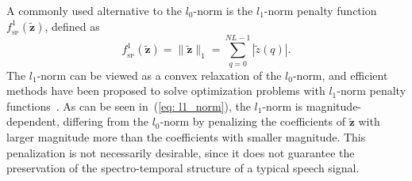 \documentclass[10pt]{IEEEtran}
\begin{document}
A commonly used alternative to the $l_0$-norm is the $l_1$-norm penalty function $f_{_{\text{SP}}}^1(\tilde{\mathbf{z}})$, defined as
\begin{equation}
  \label{eq: l1_norm}
  f_{_{\text{SP}}}^1(\tilde{\mathbf{z}}) = \| \tilde{\mathbf{z}}\|_1 = \sum_{q = 0}^{NL-1} |\tilde{z}(q)|.
\end{equation}
The $l_1$-norm can be viewed as a convex relaxation of the $l_0$-norm, and efficient methods have been proposed to solve optimization problems with $l_1$-norm penalty functions~\cite{Chartrand_ICASSP_2014,Boyd_book}.
As can be seen in~(\ref{eq: l1_norm}), the $l_1$-norm is magnitude-dependent, differing from the $l_0$-norm by penalizing the coefficients of $\tilde{\mathbf{z}}$ with larger magnitude more than the coefficients with smaller magnitude.
This penalization is not necessarily desirable, since it does not guarantee the preservation of the spectro-temporal structure of a typical speech signal. 
\end{document}

